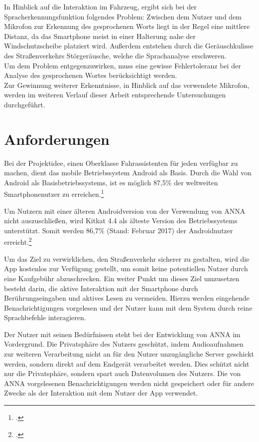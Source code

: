 In Hinblick auf die Interaktion im Fahrzeug, ergibt sich bei der Spracherkennungsfunktion folgendes Problem: Zwischen dem Nutzer und dem Mikrofon zur Erkennung des gesprochenen Worts liegt in der Regel eine mittlere Distanz, da das Smartphone meist in einer Halterung nahe der Windschutzscheibe platziert wird. Außerdem entstehen durch die Geräuschkulisse  des Straßenverkehrs Störgeräusche, welche die Sprachanalyse erschweren.\\
Um dem Problem entgegenzuwirken, muss eine gewisse Fehlertoleranz bei der Analyse des gesprochenen Wortes berücksichtigt werden.\\
Zur Gewinnung weiterer Erkenntnisse, in Hinblick auf das verwendete Mikrofon, werden im weiteren Verlauf dieser Arbeit entsprechende Untersuchungen durchgeführt.

\section{Anforderungen}
\label{sec:requirements}
Bei der Projektidee, einen Oberklasse Fahrassistenten für jeden verfügbar zu machen, dient das mobile Betriebssystem Android als Basis. Durch die Wahl von Android als Basisbetriebssystems, ist es möglich 87,5\% der weltweiten Smartphonenutzer zu erreichen.\footcite[vgl.:][]{t3n}  

Um Nutzern mit einer älteren Androidversion von der Verwendung von \ac{ANNA} nicht auszuschließen, wird Kitkat 4.4 als älteste Version des Betriebssystems unterstützt. Somit werden 86,7\% (Stand: Februar 2017) der Androidnutzer erreicht.\footcite[vgl.:][]{androidDistribution}

Um das Ziel zu verwirklichen, den Straßenverkehr sicherer zu gestalten, wird die App kostenlos zur Verfügung gestellt, um somit keine potentiellen Nutzer durch eine Kaufgebühr abzuschrecken. Ein weiter Punkt um dieses Ziel umzusetzen besteht darin, die aktive Interaktion mit der Smartphone durch Berührungseingaben und aktives Lesen zu vermeiden. Hierzu werden eingehende Benachrichtigungen vorgelesen und der Nutzer kann mit dem System durch reine Sprachbefehle interagieren.

Der Nutzer mit seinen Bedürfnissen steht bei der Entwicklung von \ac{ANNA} im Vordergrund. Die Privatsphäre des Nutzers geschützt, indem Audioaufnahmen zur weiteren Verarbeitung nicht an für den Nutzer unzugängliche Server geschickt werden, sondern direkt auf dem Endgerät verarbeitet werden. Dies schützt nicht nur die Privatsphäre, sondern spart auch Datenvolumen des Nutzers.
Die von \ac{ANNA} vorgelesenen Benachrichtigungen werden nicht gespeichert oder für andere Zwecke als der Interaktion mit dem Nutzer der App verwendet.

